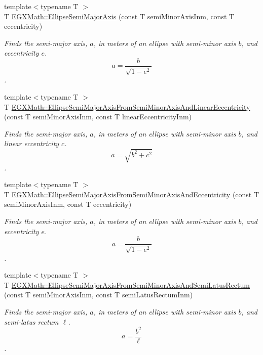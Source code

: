 \begin{DoxyCompactItemize}
\item 
{\footnotesize template$<$typename T $>$ }\\T \mbox{\hyperlink{group___e_g_x_math-_geometry-2_d-_ellipse-_semi_major_axis_ga646a2ca065f4ac3f666a9ea22f3bb527}{E\+G\+X\+Math\+::\+Ellipse\+Semi\+Major\+Axis}} (const T semi\+Minor\+Axis\+Inm, const T eccentricity)
\begin{DoxyCompactList}\small\item\em Finds the semi-\/major axis, $a$, in meters of an ellipse with semi-\/minor axis $b$, and eccentricity $e$. \[ a=\frac{b}{\sqrt{1-e^2}} \]. \end{DoxyCompactList}\item 
{\footnotesize template$<$typename T $>$ }\\T \mbox{\hyperlink{group___e_g_x_math-_geometry-2_d-_ellipse-_semi_major_axis_gaed0cc0b8da6cffa6cb9e28e773bc6e16}{E\+G\+X\+Math\+::\+Ellipse\+Semi\+Major\+Axis\+From\+Semi\+Minor\+Axis\+And\+Linear\+Eccentricity}} (const T semi\+Minor\+Axis\+Inm, const T linear\+Eccentricity\+Inm)
\begin{DoxyCompactList}\small\item\em Finds the semi-\/major axis, $a$, in meters of an ellipse with semi-\/minor axis $b$, and linear eccentricity $c$. \[ a=\sqrt{b^2+c^2} \]. \end{DoxyCompactList}\item 
{\footnotesize template$<$typename T $>$ }\\T \mbox{\hyperlink{group___e_g_x_math-_geometry-2_d-_ellipse-_semi_major_axis_ga505f404b0c1f4f73853c97e0a9ee2ef1}{E\+G\+X\+Math\+::\+Ellipse\+Semi\+Major\+Axis\+From\+Semi\+Minor\+Axis\+And\+Eccentricity}} (const T semi\+Minor\+Axis\+Inm, const T eccentricity)
\begin{DoxyCompactList}\small\item\em Finds the semi-\/major axis, $a$, in meters of an ellipse with semi-\/minor axis $b$, and eccentricity $e$. \[ a=\frac{b}{\sqrt{1-e^2}} \]. \end{DoxyCompactList}\item 
{\footnotesize template$<$typename T $>$ }\\T \mbox{\hyperlink{group___e_g_x_math-_geometry-2_d-_ellipse-_semi_major_axis_ga1352fb9ee77a05d6b5d733c0fa048479}{E\+G\+X\+Math\+::\+Ellipse\+Semi\+Major\+Axis\+From\+Semi\+Minor\+Axis\+And\+Semi\+Latus\+Rectum}} (const T semi\+Minor\+Axis\+Inm, const T semi\+Latus\+Rectum\+Inm)
\begin{DoxyCompactList}\small\item\em Finds the semi-\/major axis, $a$, in meters of an ellipse with semi-\/minor axis $b$, and semi-\/latus rectum $\ell$. \[ a= \frac{b^2}{\ell} \]. \end{DoxyCompactList}\item 

\end{DoxyCompactItemize}
